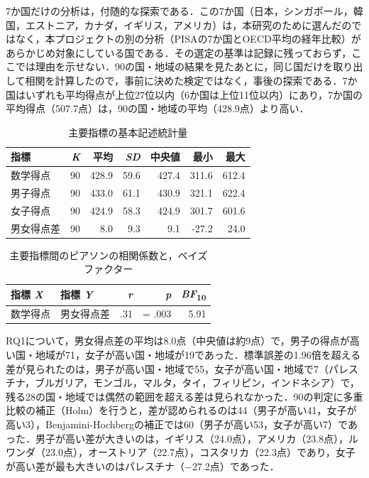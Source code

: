\documentclass[a4paper,10pt,twocolumn]{ltjsarticle}
\makeatletter
\renewcommand{\section}{\@startsection{section}{1}{\z@}{1.1\Cvs \@plus.4\Cdp \@minus.2\Cdp}{.5\Cvs \@plus.2\Cdp}{\normalfont\gtfamily\bfseries\large}}
\makeatother
\begin{document}
7か国だけの分析は，付随的な探索である．この7か国（日本，シンガポール，韓国，エストニア，カナダ，イギリス，アメリカ）は，本研究のために選んだのではなく，本プロジェクトの別の分析（PISAの7か国とOECD平均の経年比較）があらかじめ対象にしている国である．その選定の基準は記録に残っておらず，ここでは理由を示せない．90の国・地域の結果を見たあとに，同じ国だけを取り出して相関を計算したので，事前に決めた検定ではなく，事後の探索である．7か国はいずれも平均得点が上位27位以内（6か国は上位11位以内）にあり，7か国の平均得点（507.7点）は，90の国・地域の平均（428.9点）より高い．
\begin{table}[!t]
\caption{主要指標の基本記述統計量}
\centering\small
\begin{tabular}{>{\raggedright\arraybackslash}p{9.2cm}rrrrrr}
\toprule
指標 & \textit{K} & 平均 & \textit{SD} & 中央値 & 最小 & 最大 \\
\midrule
数学得点 & 90 & 428.9 & 59.6 & 427.4 & 311.6 & 612.4 \\
男子得点 & 90 & 433.0 & 61.1 & 430.9 & 321.1 & 622.4 \\
女子得点 & 90 & 424.9 & 58.3 & 424.9 & 301.7 & 601.6 \\
男女得点差 & 90 & 8.0 & 9.3 & 9.1 & -27.2 & 24.0 \\
\bottomrule
\end{tabular}
\par{}
\end{table}
\begin{table}[!t]
\caption{主要指標間のピアソンの相関係数と，ベイズファクター}
\centering\small
\begin{tabular}{>{\raggedright\arraybackslash}p{6.4cm}>{\raggedright\arraybackslash}p{6.4cm}rrr}
\toprule
指標 \textit{X} & 指標 \textit{Y} & \textit{r} & \textit{p} & \textit{BF}\textsubscript{10} \\
\midrule
数学得点 & 男女得点差 & .31 & = .003 & 5.91 \\
\bottomrule
\end{tabular}
\par{}
\end{table}
\section{結果}
RQ1について，男女得点差の平均は8.0点（中央値は約9点）で，男子の得点が高い国・地域が71，女子が高い国・地域が19であった．標準誤差の1.96倍を超える差が見られたのは，男子が高い国・地域で55，女子が高い国・地域で7（パレスチナ，ブルガリア，モンゴル，マルタ，タイ，フィリピン，インドネシア）で，残る28の国・地域では偶然の範囲を超える差は見られなかった．90の判定に多重比較の補正（Holm）を行うと，差が認められるのは44（男子が高い41，女子が高い3），Benjamini-Hochbergの補正では60（男子が高い53，女子が高い7）であった．男子が高い差が大きいのは，イギリス（24.0点），アメリカ（23.8点），ルワンダ（23.0点），オーストリア（22.7点），コスタリカ（22.3点）であり，女子が高い差が最も大きいのはパレスチナ（−27.2点）であった．
\end{document}
